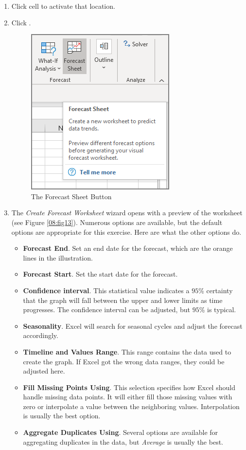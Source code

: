 \begin{enumbox}
	\begin{enumerate}
		\item Click cell  to activate that location.
		\item Click .

		\begin{figure}[H]
			\centering
			\includegraphics[width=\maxwidth{.65\linewidth}]{gfx/ch08_fig11}
			\caption{The Forecast Sheet Button}
			\label{08:fig11}
		\end{figure}

		\item The \textit{Create Forecast Worksheet} wizard opens with a preview of the worksheet (see Figure \ref{08:fig13}). Numerous options are available, but the default options are appropriate for this exercise. Here are what the other options do.
		
		\begin{itemize}
			\item \textbf{Forecast End}. Set an end date for the forecast, which are the orange lines in the illustration.
			\item \textbf{Forecast Start}. Set the start date for the forecast.
			\item \textbf{Confidence interval}. This statistical value indicates a $ 95 $\% certainty that the graph will fall between the upper and lower limits as time progresses. The confidence interval can be adjusted, but $ 95 $\% is typical.
			\item \textbf{Seasonality}. Excel will search for seasonal cycles and adjust the forecast accordingly.
			\item \textbf{Timeline and Values Range}. This range contains the data used to create the graph. If Excel got the wrong data ranges, they could be adjusted here.
			\item \textbf{Fill Missing Points Using}. This selection specifies how Excel should handle missing data points. It will either fill those missing values with zero or interpolate a value between the neighboring values. Interpolation is usually the best option.
			\item \textbf{Aggregate Duplicates Using}. Several options are available for aggregating duplicates in the data, but \textit{Average} is usually the best.
		\end{itemize}	
		

\end{enumerate}
\end{enumbox}
